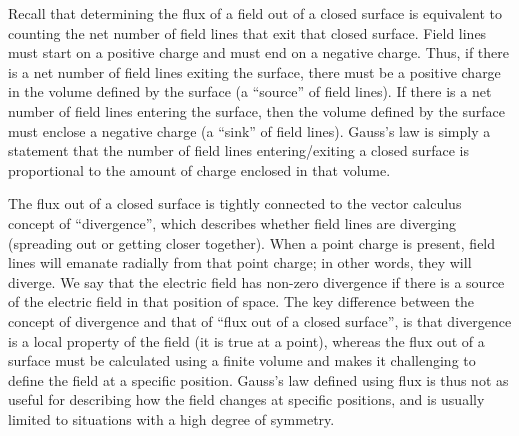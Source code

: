 Recall that determining the flux of a field out of a closed surface is equivalent to counting the net number of field lines that exit that closed surface. Field lines must start on a positive charge and must end on a negative charge. Thus, if there is a net number of field lines exiting the surface, there must be a positive charge in the volume defined by the surface (a ``source'' of field lines). If there is a net number of field lines entering the surface, then the volume defined by the surface must enclose a negative charge (a ``sink'' of field lines). Gauss's law is simply a statement that the number of field lines entering/exiting a closed surface is proportional to the amount of charge enclosed in that volume.

The flux out of a closed surface is tightly connected to the vector calculus concept of ``divergence'', which describes whether field lines are diverging (spreading out or getting closer together). When a point charge is present, field lines will emanate radially from that point charge; in other words, they will diverge. We say that the electric field has non-zero divergence if there is a source of the electric field in that position of space. The key difference between the concept of divergence and that of ``flux out of a closed surface'', is that divergence is a local property of the field (it is true at a point), whereas the flux out of a surface must be calculated using a finite volume and makes it challenging to define the field at a specific position. Gauss's law defined using flux is thus not as useful for describing how the field changes at specific positions, and is usually limited to situations with a high degree of symmetry.

